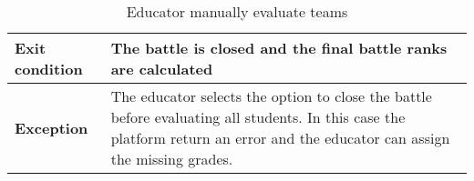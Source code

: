\begin{enumerate}[label=\textbf{UC\arabic*}:,ref=UC\arabic*,leftmargin=1.3cm]
{\begin{table}[H]
\begin{tabular}{|l|p{11.9cm}|}
                        \textbf{Exit condition}  & The battle is closed and the final battle ranks are calculated                      \\\hline
                        \textbf{Exception}       & The educator selects the option to close the battle before evaluating all students.
                        In this case the platform return an error and the educator can assign the missing grades.                      \\\hline
                  \end{tabular}
                  \caption{Educator manually evaluate teams    }
                  \label{table:Educator manually evaluate teams    }
            \end{table}
            \begin{adjustbox}{
                        max size={\textwidth}{},
                        caption={Educator manually evaluate teams},
                        label={fig:Educator manually evaluate teams},
                        figure=H}
                  \centering
            \end{adjustbox}
            \pagebreak
      }
\end{enumerate}
